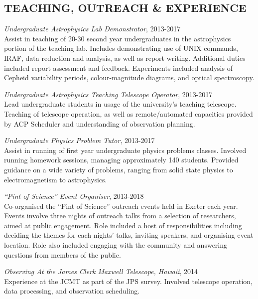 \documentclass[letter, margin, 10pt]{res} %
\begin{document}
\begin{resume}
 
\section{TEACHING, OUTREACH \& EXPERIENCE}

{\sl Undergraduate Astrophysics Lab Demonstrator}, 2013-2017\\
Assist in teaching of 20-30 second year undergraduates in the astrophysics portion of the teaching lab. Includes demonstrating use of UNIX commands, IRAF, data reduction and analysis, as well as report writing. Additional duties included report assessment and feedback. Experiments included analysis of Cepheid variability periods, colour-magnitude diagrams, and optical spectroscopy.

{\sl Undergraduate Astrophysics Teaching Telescope Operator}, 2013-2017\\
Lead undergraduate students in usage of the university's teaching telescope. Teaching of telescope operation, as well as remote/automated capacities provided by ACP Scheduler and understanding of observation planning.

{\sl Undergraduate Physics Problem Tutor}, 2013-2017\\
Assist in running of first year undergraduate physics problems classes. Involved running homework sessions, managing approximately 140 students. Provided guidance on a wide variety of problems, ranging from solid state physics to electromagnetism to astrophysics. 

{\sl ``Pint of Science'' Event Organiser}, 2013-2018\\
Co-organised the ``Pint of Science'' outreach events held in Exeter each year. Events involve three nights of outreach talks from a selection of researchers, aimed at public engagement. Role included a host of responsibilities including deciding the themes for each nights' talks, inviting speakers, and organising event location. Role also included engaging with the community and answering questions from members of the public.

{\sl Observing At the James Clerk Maxwell Telescope, Hawaii}, 2014\\
Experience at the JCMT as part of the JPS survey. Involved telescope operation, data processing, and observation scheduling.


\end{resume}
\end{document}
